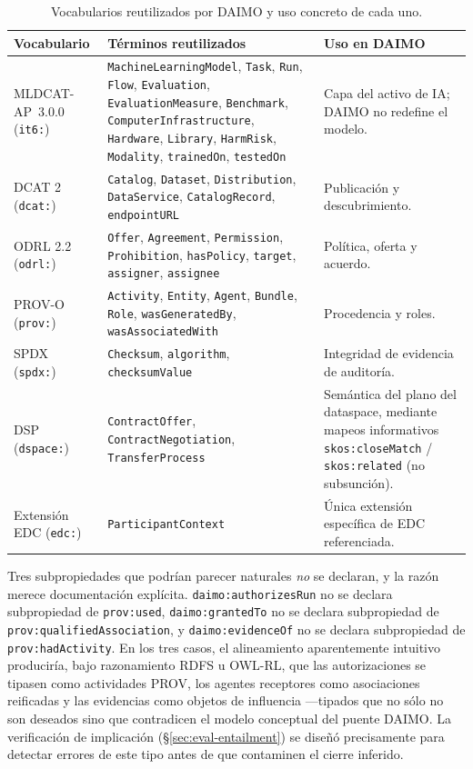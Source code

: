 \documentclass[11pt,a4paper]{article}
\newcommand{\code}[1]{\texttt{#1}}
\begin{document}
\begin{table}[t]
\caption{Vocabularios reutilizados por DAIMO y uso concreto de cada uno.}
\label{tab:reuse}
\centering
\small
\begin{tabularx}{\textwidth}{@{}L{2.4cm}L{5cm}X@{}}
\toprule
\textbf{Vocabulario} & \textbf{Términos reutilizados} & \textbf{Uso en DAIMO} \\
\midrule
MLDCAT-AP~3.0.0 (\code{it6:}) & \code{MachineLearningModel}, \code{Task}, \code{Run}, \code{Flow}, \code{Evaluation}, \code{EvaluationMeasure}, \code{Benchmark}, \code{ComputerInfrastructure}, \code{Hardware}, \code{Library}, \code{HarmRisk}, \code{Modality}, \code{trainedOn}, \code{testedOn} & Capa del activo de IA; DAIMO no redefine el modelo. \\[0.4em]
DCAT 2 (\code{dcat:}) & \code{Catalog}, \code{Dataset}, \code{Distribution}, \code{DataService}, \code{CatalogRecord}, \code{endpointURL} & Publicación y descubrimiento. \\[0.4em]
ODRL 2.2 (\code{odrl:}) & \code{Offer}, \code{Agreement}, \code{Permission}, \code{Prohibition}, \code{hasPolicy}, \code{target}, \code{assigner}, \code{assignee} & Política, oferta y acuerdo. \\[0.4em]
PROV-O (\code{prov:}) & \code{Activity}, \code{Entity}, \code{Agent}, \code{Bundle}, \code{Role}, \code{wasGeneratedBy}, \code{wasAssociatedWith} & Procedencia y roles. \\[0.4em]
SPDX (\code{spdx:}) & \code{Checksum}, \code{algorithm}, \code{checksumValue} & Integridad de evidencia de auditoría. \\[0.4em]
DSP (\code{dspace:}) & \code{ContractOffer}, \code{ContractNegotiation}, \code{TransferProcess} & Semántica del plano del dataspace, mediante mapeos informativos \code{skos:closeMatch} / \code{skos:related} (no subsunción). \\[0.4em]
Extensión EDC (\code{edc:}) & \code{ParticipantContext} & Única extensión específica de EDC referenciada. \\
\bottomrule
\end{tabularx}
\end{table}

Tres subpropiedades que podrían parecer naturales \emph{no} se declaran, y la razón merece documentación explícita. \code{daimo:authorizesRun} no se declara subpropiedad de \code{prov:used}, \code{daimo:grantedTo} no se declara subpropiedad de \code{prov:qualifiedAssociation}, y \code{daimo:evidenceOf} no se declara subpropiedad de \code{prov:hadActivity}. En los tres casos, el alineamiento aparentemente intuitivo produciría, bajo razonamiento RDFS u OWL-RL, que las autorizaciones se tipasen como actividades PROV, los agentes receptores como asociaciones reificadas y las evidencias como objetos de influencia ---tipados que no sólo no son deseados sino que contradicen el modelo conceptual del puente DAIMO. La verificación de implicación (§\ref{sec:eval-entailment}) se diseñó precisamente para detectar errores de este tipo antes de que contaminen el cierre inferido.
\end{document}
